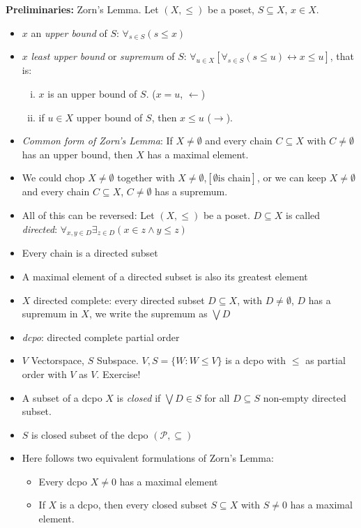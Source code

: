 \documentclass[headsepline=true,DIV=11]{scrartcl}
\theoremstyle{definition}
\begin{document}
{\bf Preliminaries:} Zorn's Lemma.
Let $(X,\le)$ be a poset, $S\subseteq X$, $x\in X$. 
\begin{itemize}
	\item $x$ an {\em upper bound} of $S$: $\forall_{s\in S}(s\le x)$
	\item $x$ {\em least upper bound} or {\em supremum} of $S$: $\forall_{u\in X}[\forall_{s\in S}(s\le u) \leftrightarrow x\le u]$, that is:
	\begin{enumerate}[(i)]
		\item $x$ is an upper bound of $S$. ($x=u$, $\leftarrow$)
		\item if $u\in X$ upper bound of $S$, then $x\le u$ ($\rightarrow$).
	\end{enumerate}
	\item {\em Common form of Zorn's Lemma}: If $X\neq \emptyset$ and every chain $C\subseteq X$ with $C\neq \emptyset$ has an upper bound, then $X$ has a maximal element.
	\item We could chop $X\neq\emptyset$ together with $X\neq \emptyset$,$[\emptyset \text{is chain}]$, or we can keep $X\neq \emptyset$ and every chain $C\subseteq X$, $C\neq\emptyset$ has a supremum.
	\item All of this can be reversed: 
		Let $(X,\le)$ be a poset.
		$D\subseteq X$ is called {\em directed}: $\forall_{x,y \in D} \exists_{z\in D}(x\in z \land y\le z)$
	\item Every chain is a directed subset
	\item A maximal element of a directed subset is also its greatest element
	\item $X$ directed complete: every directed subset $D\subseteq X$, with $D\neq \emptyset$, $D$ has a supremum in $X$, we write the supremum as $\bigvee D$
	\item {\em dcpo}: directed complete partial order
	\item $V$ Vectorspace, $S$ Subspace. $V, S =\{ W\colon W\le V\}$ is a dcpo with $\le$ as partial order with $V$ as $V$. Exercise!
	
	\item A subset of a dcpo $X$ is {\em closed} if $\bigvee D\in S$ for all $D\subseteq S$ non-empty directed subset.
	\item $S$ is closed subset of the dcpo $(\mathcal P, \subseteq)$
	\item Here follows two equivalent formulations of Zorn's Lemma:
	\begin{itemize}
		\item Every dcpo $X\neq 0$ has a maximal element
		\item If $X$ is a dcpo, then every closed subset $S\subseteq X$ with $S\neq 0$ has a maximal element.
	\end{itemize}
\end{itemize}
\end{document}
